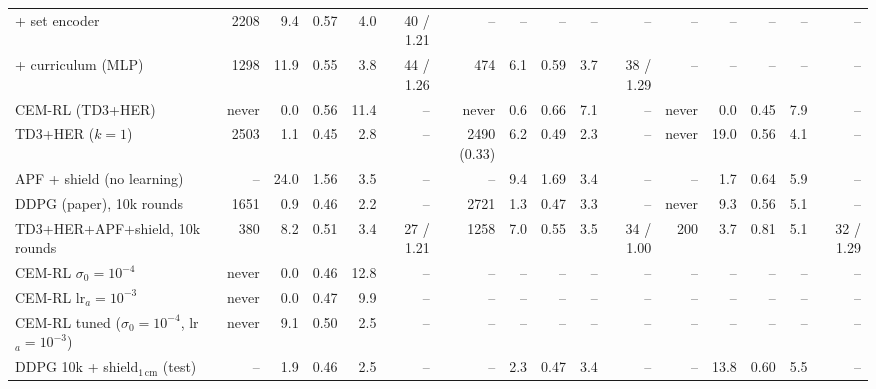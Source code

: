 \begin{table}[t]
\begin{tabular}{lrrrrrrrrrrrrrrr}
\quad + set encoder & 2208 & 9.4 & 0.57 & 4.0 & 40 / 1.21 & -- & -- & -- & -- & -- & -- & -- & -- & -- & -- \\
\quad + curriculum (MLP) & 1298 & 11.9 & 0.55 & 3.8 & 44 / 1.26 & 474 & 6.1 & 0.59 & 3.7 & 38 / 1.29 & -- & -- & -- & -- & -- \\
CEM-RL (TD3+HER) & never & 0.0 & 0.56 & 11.4 & -- & never & 0.6 & 0.66 & 7.1 & -- & never & 0.0 & 0.45 & 7.9 & -- \\
TD3+HER ($k{=}1$) & 2503 & 1.1 & 0.45 & 2.8 & -- & 2490 (0.33) & 6.2 & 0.49 & 2.3 & -- & never & 19.0 & 0.56 & 4.1 & -- \\
APF + shield (no learning) & -- & 24.0 & 1.56 & 3.5 & -- & -- & 9.4 & 1.69 & 3.4 & -- & -- & 1.7 & 0.64 & 5.9 & -- \\
DDPG (paper), 10k rounds & 1651 & 0.9 & 0.46 & 2.2 & -- & 2721 & 1.3 & 0.47 & 3.3 & -- & never & 9.3 & 0.56 & 5.1 & -- \\
TD3+HER+APF+shield, 10k rounds & 380 & 8.2 & 0.51 & 3.4 & 27 / 1.21 & 1258 & 7.0 & 0.55 & 3.5 & 34 / 1.00 & 200 & 3.7 & 0.81 & 5.1 & 32 / 1.29 \\
CEM-RL $\sigma_0{=}10^{-4}$ & never & 0.0 & 0.46 & 12.8 & -- & -- & -- & -- & -- & -- & -- & -- & -- & -- & -- \\
CEM-RL lr$_a{=}10^{-3}$ & never & 0.0 & 0.47 & 9.9 & -- & -- & -- & -- & -- & -- & -- & -- & -- & -- & -- \\
CEM-RL tuned ($\sigma_0{=}10^{-4}$, lr$_a{=}10^{-3}$) & never & 9.1 & 0.50 & 2.5 & -- & -- & -- & -- & -- & -- & -- & -- & -- & -- & -- \\
DDPG 10k + shield$_{1\,\mathrm{cm}}$ (test) & -- & 1.9 & 0.46 & 2.5 & -- & -- & 2.3 & 0.47 & 3.4 & -- & -- & 13.8 & 0.60 & 5.5 & -- \\
\bottomrule
\end{tabular}
\end{table}